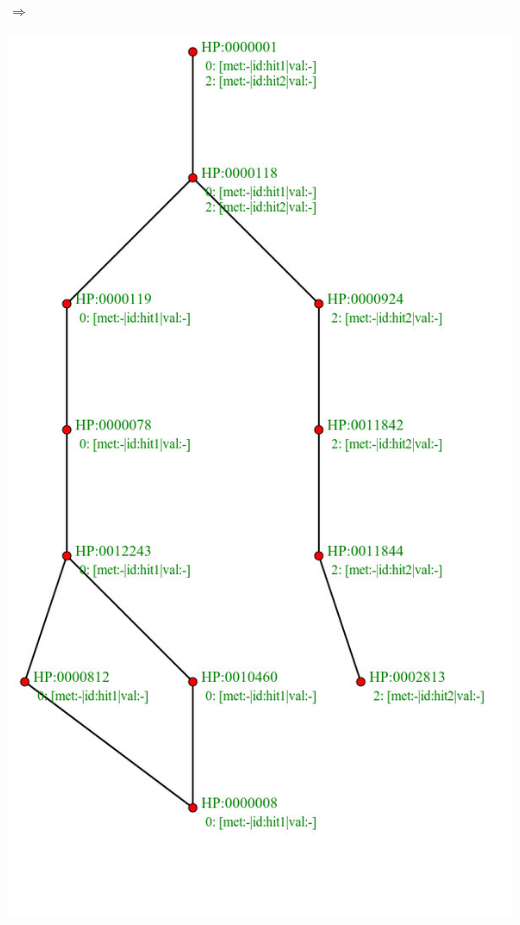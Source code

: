 \documentclass{beamer}
\begin{document}
\begin{frame}
\begin{minipage}{0.1\textwidth}
			\vspace*{1.0em}
		\end{minipage}$\Rightarrow$
		\begin{minipage}{0.3\textwidth}
		\includegraphics[width=\textwidth]{g.jpg}
		\end{minipage}
		
		
\end{frame}
\end{document}
